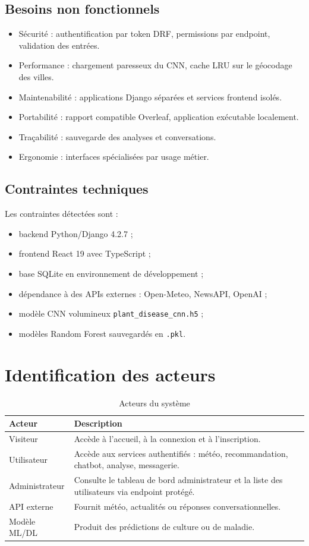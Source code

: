 \subsection{Besoins non fonctionnels}
\begin{itemize}[noitemsep]
  \item Sécurité : authentification par token DRF, permissions par endpoint, validation des entrées.
  \item Performance : chargement paresseux du CNN, cache LRU sur le géocodage des villes.
  \item Maintenabilité : applications Django séparées et services frontend isolés.
  \item Portabilité : rapport compatible Overleaf, application exécutable localement.
  \item Traçabilité : sauvegarde des analyses et conversations.
  \item Ergonomie : interfaces spécialisées par usage métier.
\end{itemize}

\subsection{Contraintes techniques}
Les contraintes détectées sont :
\begin{itemize}[noitemsep]
  \item backend Python/Django 4.2.7 ;
  \item frontend React 19 avec TypeScript ;
  \item base SQLite en environnement de développement ;
  \item dépendance à des APIs externes : Open-Meteo, NewsAPI, OpenAI ;
  \item modèle CNN volumineux \texttt{plant\_disease\_cnn.h5} ;
  \item modèles Random Forest sauvegardés en \texttt{.pkl}.
\end{itemize}

\section{Identification des acteurs}
\begin{table}[H]
\centering
\caption{Acteurs du système}
\begin{tabular}{p{3cm}p{10cm}}
\toprule
\textbf{Acteur} & \textbf{Description} \\
\midrule
Visiteur & Accède à l'accueil, à la connexion et à l'inscription. \\
Utilisateur & Accède aux services authentifiés : météo, recommandation, chatbot, analyse, messagerie. \\
Administrateur & Consulte le tableau de bord administrateur et la liste des utilisateurs via endpoint protégé. \\
API externe & Fournit météo, actualités ou réponses conversationnelles. \\
Modèle ML/DL & Produit des prédictions de culture ou de maladie. \\
\bottomrule
\end{tabular}
\end{table}

